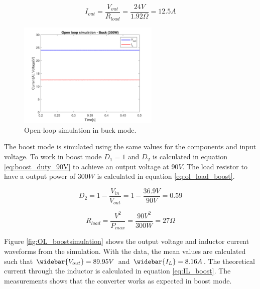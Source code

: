 \begin{equation} \label{eq:Iout_buck}
I_{out} = \frac{V_{out}}{R_{load}} = \frac{24V}{1.92\Omega} = 12.5A
\end{equation}   

\begin{figure}[H]
 	\begin{center}
 		\includegraphics[width=0.6\textwidth]{../Pictures/P1/Open_loop_simulation/open_loop_buck_300W}
 		\caption{Open-loop simulation in buck mode.}
 		\label{fig:OL_bucksimulation}
 	\end{center}
\end{figure} 


The boost mode is simulated using the same values for the components and input voltage. To work in boost mode $D_1 = 1$ and $D_2$ is calculated in equation \ref{eq:boost_duty_90V} to achieve an output voltage at $90V$. The load resistor to have a output power of $300W$ is calculated in equation \ref{eq:ol_load_boost}.

\begin{equation} \label{eq:boost_duty_90V}
	D_2 = 1-\frac{V_{in}}{V_{out}} = 1 - \frac{36.9V}{90V} = 0.59
\end{equation}

\begin{equation} \label{eq:ol_load_boost}
	R_{load} = \frac{V^2}{P_{max}} = \frac{90V^2}{300W} = 27 \Omega
\end{equation}

Figure \ref{fig:OL_boostsimulation} shows the output voltage and inductor current waveforms from the simulation. With the data, the mean values are calculated such that $\widebar{V_{out}} = 89.95V$ and $\widebar{I_L} = 8.16A$. The theoretical current through the inductor is calculated in equation \ref{eq:IL_boost}. The measurements shows that the converter works as expected in boost mode.


